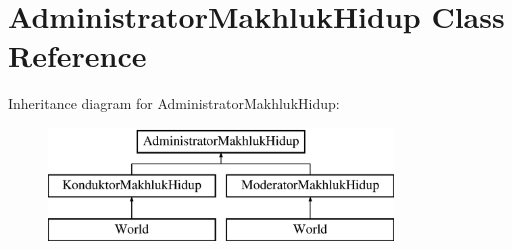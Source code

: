 \hypertarget{class_administrator_makhluk_hidup}{}\section{Administrator\+Makhluk\+Hidup Class Reference}
\label{class_administrator_makhluk_hidup}
Inheritance diagram for Administrator\+Makhluk\+Hidup\+:\begin{figure}[H]
\begin{center}
\leavevmode
\includegraphics[height=3.000000cm]{class_administrator_makhluk_hidup}
\end{center}
\end{figure}
